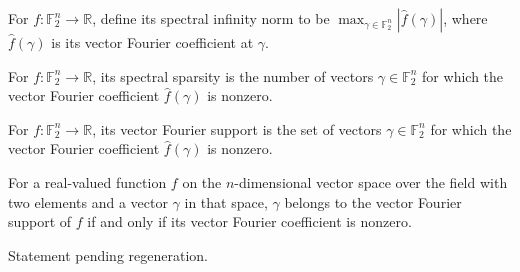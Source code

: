 \begin{definition}
\label{FABL.spectralInfinityNorm}
\leanok
{}
For $f:\mathbb{F}_2^n\to\mathbb{R}$, define its spectral infinity norm to be
$\max_{\gamma\in\mathbb{F}_2^n}|\widehat f(\gamma)|$, where $\widehat f(\gamma)$ is its
vector Fourier coefficient at $\gamma$.
\end{definition}

\begin{definition}
\label{FABL.spectralSparsity}
\leanok
{}
For $f:\mathbb{F}_2^n\to\mathbb{R}$, its spectral sparsity is the number of vectors
$\gamma\in\mathbb{F}_2^n$ for which the vector Fourier coefficient $\widehat f(\gamma)$
is nonzero.
\end{definition}

\begin{definition}
\label{FABL.vectorFourierSupport}
\leanok
{}
For $f:\mathbb{F}_2^n\to\mathbb{R}$, its vector Fourier support is the set of vectors
$\gamma\in\mathbb{F}_2^n$ for which the vector Fourier coefficient $\widehat f(\gamma)$
is nonzero.
\end{definition}

\begin{theorem}
\label{FABL.mem_vectorFourierSupport}
\leanok
{}
For a real-valued function $f$ on the $n$-dimensional vector space over the field with
two elements and a vector $\gamma$ in that space, $\gamma$ belongs to the vector Fourier
support of $f$ if and only if its vector Fourier coefficient is nonzero.
\end{theorem}

\begin{theorem}
\label{FABL.spectralSparsity_eq_card_vectorFourierSupport}
\leanok
{}
Statement pending regeneration.
\end{theorem}

